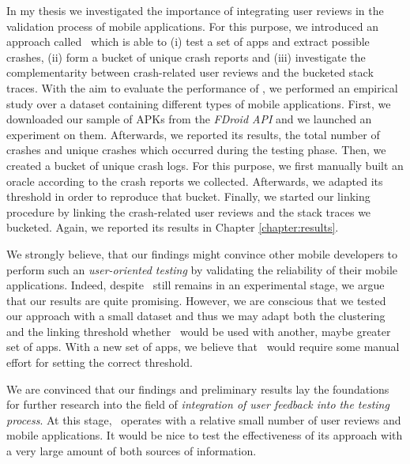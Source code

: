 \label{chapter:conclusion}
In my thesis we investigated the importance of integrating user reviews in the validation process of mobile applications. 
For this purpose, we introduced an approach called \toolname\ which is able to (i) test a set of apps and extract possible crashes, (ii) form a bucket of unique crash reports and 
(iii) investigate the complementarity between crash-related user reviews and the bucketed stack traces. 
With the aim to evaluate the performance of \toolname, we performed an empirical study 
over a dataset containing different types of mobile applications. 
First, we downloaded our sample of APKs from the \textit{FDroid API} and we launched an experiment on them. 
Afterwards, we reported its results, \ie the total number of crashes and unique crashes which occurred during the testing phase. 
Then, we created a bucket of unique crash logs. For this purpose, we first manually built an oracle according to the crash reports we collected. 
Afterwards, we adapted its threshold in order to reproduce that bucket. 
Finally, we started our linking procedure by linking the crash-related user reviews and the stack traces we bucketed. 
Again, we reported its results in Chapter \ref{chapter:results}. 
 
 
We strongly believe, that our findings might convince other mobile developers to perform such an \textit{user-oriented testing} by validating the reliability of their mobile applications. 
Indeed, despite \toolname\ still remains in an experimental stage, we argue that our results are quite promising. 
However, we are conscious that we tested our approach with a small dataset and thus we may adapt both the clustering and the linking threshold whether \toolname\ would be used with another, maybe greater set of apps. 
With a new set of apps, we believe that \toolname\ would require some manual effort for setting the correct threshold. 

We are convinced that our findings and preliminary results lay the foundations for further research  into the field of \textit{integration of user feedback into the testing process}. 
At this stage, \toolname\ operates with a relative small number of user reviews and mobile applications. It would be nice to test the effectiveness of its approach with a very large amount of both sources of information. \\

